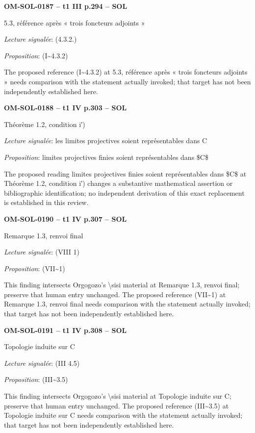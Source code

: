 \par\noindent\textbf{OM-SOL-0187 -- t1 III p.294 -- SOL}\par
5.3, référence après « trois foncteurs adjoints »\par
\emph{Lecture signalée}: (4.3.2.)\par
\emph{Proposition}: (I\textasciitilde{}4.3.2)\par
The proposed reference (I\textasciitilde{}4.3.2) at 5.3, référence après « trois foncteurs adjoints » needs comparison with the statement actually invoked; that target has not been independently established here.\par
\par\noindent\textbf{OM-SOL-0188 -- t1 IV p.303 -- SOL}\par
Théorème 1.2, condition i′)\par
\emph{Lecture signalée}: les limites projectives soient représentables dans C\par
\emph{Proposition}: limites projectives finies soient représentables dans \$C\$\par
The proposed reading limites projectives finies soient représentables dans \$C\$ at Théorème 1.2, condition i′) changes a substantive mathematical assertion or bibliographic identification; no independent derivation of this exact replacement is established in this review.\par
\par\noindent\textbf{OM-SOL-0190 -- t1 IV p.307 -- SOL}\par
Remarque 1.3, renvoi final\par
\emph{Lecture signalée}: (VIII 1)\par
\emph{Proposition}: (VII\textasciitilde{}1)\par
This finding intersects Orgogozo's \textbackslash{}sisi material at Remarque 1.3, renvoi final; preserve that human entry unchanged. The proposed reference (VII\textasciitilde{}1) at Remarque 1.3, renvoi final needs comparison with the statement actually invoked; that target has not been independently established here.\par
\par\noindent\textbf{OM-SOL-0191 -- t1 IV p.308 -- SOL}\par
Topologie induite sur C\par
\emph{Lecture signalée}: (III 4.5)\par
\emph{Proposition}: (III\textasciitilde{}3.5)\par
This finding intersects Orgogozo's \textbackslash{}sisi material at Topologie induite sur C; preserve that human entry unchanged. The proposed reference (III\textasciitilde{}3.5) at Topologie induite sur C needs comparison with the statement actually invoked; that target has not been independently established here.\par
